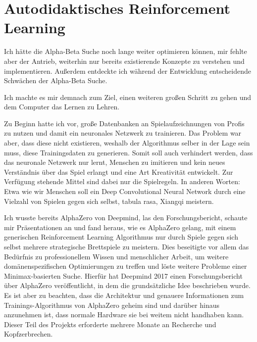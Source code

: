 \documentclass{jpp}
\begin{document}
\section{Autodidaktisches Reinforcement Learning}
Ich hätte die Alpha-Beta Suche noch lange weiter optimieren können, mir fehlte aber der Antrieb, weiterhin nur bereits existierende Konzepte zu verstehen und implementieren. Außerdem entdeckte ich während der Entwicklung entscheidende Schwächen der Alpha-Beta Suche.

Ich machte es mir demnach zum Ziel, einen weiteren großen Schritt zu gehen und dem Computer das Lernen zu Lehren. 

Zu Beginn hatte ich vor, große Datenbanken an Spielaufzeichnungen von Profis zu nutzen und damit ein neuronales Netzwerk zu trainieren. Das Problem war aber, dass diese nicht existieren, weshalb der Algorithmus selber in der Lage sein muss, diese Trainingsdaten zu generieren. Somit soll auch verhindert werden, dass das neuronale Netzwerk nur lernt, Menschen zu imitieren und kein neues Verständnis über das Spiel erlangt und eine Art Kreativität entwickelt. Zur Verfügung stehende Mittel sind dabei nur die Spielregeln. In anderen Worten: Etwa wie wir Menschen soll ein Deep Convolutional Neural Network durch eine Vielzahl von Spielen gegen sich selbst, tabula rasa, Xiangqi meistern. 

Ich wusste bereits  AlphaZero von Deepmind, las den Forschungsbericht, schaute mir Präsentationen an und fand heraus, wie es AlphaZero gelang, mit einem generischen Reinforcement Learning Algorithmus nur durch Spiele gegen sich selbst mehrere strategische Brettspiele zu meistern. Dies beseitigte vor allem das Bedürfnis zu professionellem Wissen und menschlicher Arbeit, um weitere domänenspezifischen Optimierungen zu treffen und löste weitere Probleme einer Minimax-basierten Suche.
Hierfür hat Deepmind 2017 einen Forschungsbericht über AlphaZero veröffentlicht, in dem die grundsätzliche Idee beschrieben wurde. Es ist aber zu beachten, dass die Architektur und genauere Informationen zum Trainings-Algorithmus von AlphaZero geheim sind und darüber hinaus anzunehmen ist, dass normale Hardware sie bei weitem nicht handhaben kann. Dieser Teil des Projekts erforderte mehrere Monate an Recherche und Kopfzerbrechen.
\end{document}
